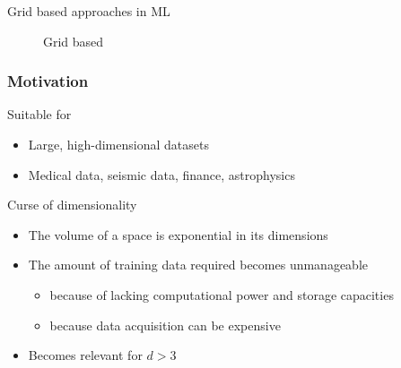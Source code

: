 \begin{frame}
\begin{block}{Grid based approaches in ML}
\begin{figure}[!htb]
      \vspace{-12px}
      \caption{Grid based}
      \endminipage
    \end{figure}
  \end{block}
\end{frame}

\begin{frame}
  \frametitle{Motivation}
  \topline
  \vspace{-10px}
  \begin{block}{Suitable for}
    \begin{itemize}
      \item Large, high-dimensional datasets
      \item Medical data, seismic data, finance, astrophysics
    \end{itemize}
  \end{block}
  \begin{block}{Curse of dimensionality}
    \begin{itemize}
    \item The volume of a space is exponential in its dimensions
    \item The amount of training data required becomes unmanageable
      \begin{itemize}
      \item because of lacking computational power and storage capacities
      \item because data acquisition can be expensive
      \end{itemize}
    \item Becomes relevant for $d > 3$
    \end{itemize}
  \end{block}
\end{frame}

